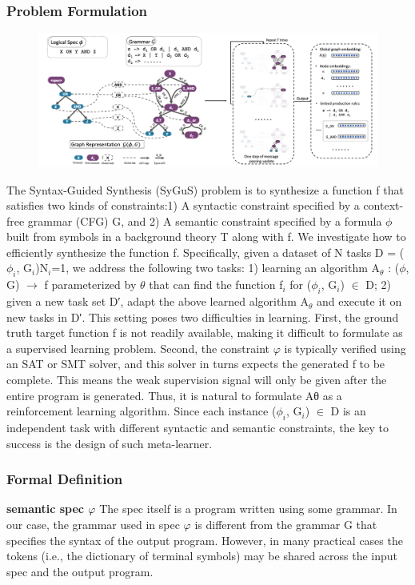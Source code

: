 \documentclass{article}
\begin{document}
\subsubsection{Problem Formulation}
\begin{figure}[ht]
\vskip 0.2in
\begin{center}
\centerline{\includegraphics[width=\columnwidth]{Images/Synthesis1-1.png}}
\label{icml-historical}
\end{center}
\vskip -0.2in
\end{figure}
The Syntax-Guided Synthesis (SyGuS) problem is to synthesize a function f that satisfies two kinds of constraints:1) A syntactic constraint specified by a context-free grammar (CFG) G, and 2) A semantic constraint specified by a formula $\phi$ built from symbols in a background theory T along with f. We investigate how to efficiently synthesize the function f. Specifically, given a dataset of N tasks D = {($\phi_i$, G$_i$)}N$_i$=1, we address the following two tasks: 1) learning an algorithm A$_\theta$ : ($\phi$, G) $\rightarrow$ f parameterized by $\theta$ that can find the function f$_i$ for ($\phi_i$, G$_i$) $\in$ D; 2) given a new task set D′, adapt the above learned algorithm A$_\theta$ and execute it on new tasks in D′. This setting poses two difficulties in learning. First, the ground truth target function f is not readily available, making it difficult to formulate as a supervised learning problem. Second, the constraint $\varphi$ is typically verified using an SAT or SMT solver, and this solver in turns expects the generated f to be complete. This means the weak supervision signal will only be given after the entire program is generated. Thus, it is natural to formulate Aθ as a reinforcement learning algorithm. Since each instance ($\phi_i$, G$_i$) $\in$ D is an independent task with different syntactic and semantic constraints, the key to success is the design of such meta-learner.
\subsubsection{Formal Definition}
\textbf{semantic spec $\varphi$} The spec itself is a program written using some grammar. In our case, the grammar used in spec $\varphi$ is different from the grammar G that specifies the syntax of the output program. However, in many practical cases the tokens (i.e., the dictionary of terminal symbols) may be shared across the input spec and the output program.
\end{document}
